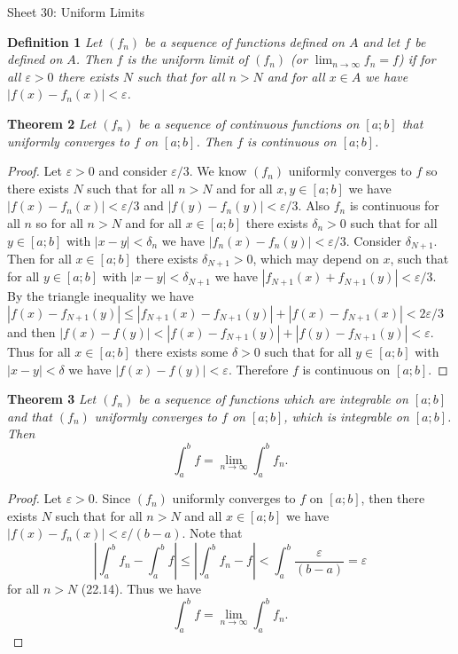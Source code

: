 \documentclass{article}
\begin{document}
\begin{flushleft}

\Large

Sheet 30: Uniform Limits\newline

\normalsize

\textbf{Definition 1}
\textsl{Let $(f_n)$ be a sequence of functions defined on $A$ and let $f$ be defined on $A$. Then $f$ is the uniform limit of $(f_n)$ (or $\lim_{n \rightarrow \infty} f_n = f$) if for all $\varepsilon > 0$ there exists $N$ such that for all $n>N$ and for all $x \in A$ we have $|f(x) - f_n(x)| < \varepsilon$.}\newline

\textbf{Theorem 2}
\textsl{Let $(f_n)$ be a sequence of continuous functions on $[a;b]$ that uniformly converges to $f$ on $[a;b]$. Then $f$ is continuous on $[a;b]$.}
\begin{proof}
Let $\varepsilon > 0$ and consider $\varepsilon/3$. We know $(f_n)$ uniformly converges to $f$ so there exists $N$ such that for all $n>N$ and for all $x,y \in [a;b]$ we have $|f(x)-f_n(x)| < \varepsilon/3$ and $|f(y)-f_n(y)| < \varepsilon/3$. Also $f_n$ is continuous for all $n$ so for all $n>N$ and for all $x \in [a;b]$ there exists $\delta_n > 0$ such that for all $y \in [a;b]$ with $|x-y| < \delta_n$ we have $|f_n(x) - f_n(y)| < \varepsilon/3$. Consider $\delta_{N+1}$. Then for all $x \in [a;b]$ there exists $\delta_{N+1} > 0$, which may depend on $x$, such that for all $y \in [a;b]$ with $|x-y| < \delta_{N+1}$ we have $|f_{N+1}(x)+f_{N+1}(y)| < \varepsilon/3$. By the triangle inequality we have $|f(x)-f_{N+1}(y)| \leq |f_{N+1}(x)-f_{N+1}(y)| + |f(x)-f_{N+1}(x)| < 2\varepsilon/3$ and then $|f(x)-f(y)| < |f(x)-f_{N+1}(y)| + |f(y)-f_{N+1}(y)| < \varepsilon$. Thus for all $x \in [a;b]$ there exists some $\delta > 0$ such that for all $y \in [a;b]$ with $|x-y| < \delta$ we have $|f(x)-f(y)| < \varepsilon$. Therefore $f$ is continuous on $[a;b]$.
\end{proof}

\textbf{Theorem 3}
\textsl{Let $(f_n)$ be a sequence of functions which are integrable on $[a;b]$ and that $(f_n)$ uniformly converges to $f$ on $[a;b]$, which is integrable on $[a;b]$. Then
\[
\int_a^b f = \lim_{n \rightarrow \infty} \int_a^b f_n.
\]}
\begin{proof}
Let $\varepsilon > 0$. Since $(f_n)$ uniformly converges to $f$ on $[a;b]$, then there exists $N$ such that for all $n>N$ and all $x \in [a;b]$ we have $|f(x) - f_n(x)| < \varepsilon/(b-a)$. Note that
\[
\left | \int_a^b f_n - \int_a^b f \right | \leq \left | \int_a^b f_n - f \right | < \int_a^b \frac{\varepsilon}{(b-a)} = \varepsilon
\]
for all $n>N$ (22.14). Thus we have
\[
\int_a^b f = \lim_{n \rightarrow \infty} \int_a^b f_n.
\]
\end{proof}


\end{flushleft}
\end{document}
